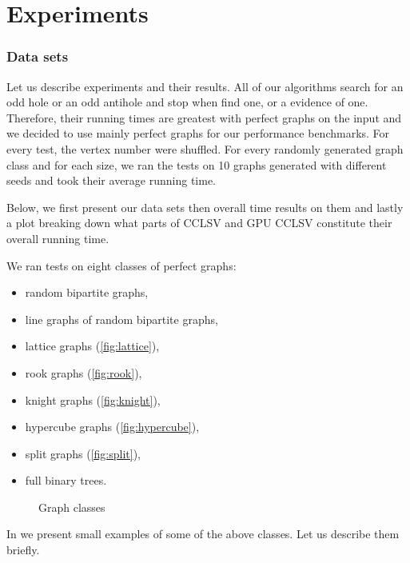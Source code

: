 \section{Experiments}
\label{sec:experiments}

\subsubsection{Data sets}

Let us describe experiments and their results. All of our algorithms search for an odd hole or an odd antihole and stop when find one, or a evidence of one. Therefore, their running times are greatest with perfect graphs on the input and we decided to use mainly perfect graphs for our performance benchmarks. For every test, the vertex number were shuffled. For every randomly generated graph class and for each size, we ran the tests on 10 graphs generated with different seeds and took their average running time.

Below, we first present our data sets then overall time results on them and lastly a plot breaking down what parts of CCLSV and GPU CCLSV constitute their overall running time.

We ran tests on eight classes of perfect graphs:
\begin{itemize}
  \item random bipartite graphs,
  \item line graphs of random bipartite graphs,
  \item lattice graphs (\cref{fig:lattice}),
  \item rook graphs (\cref{fig:rook}),
  \item knight graphs (\cref{fig:knight}),
  \item hypercube graphs (\cref{fig:hypercube}),
  \item split graphs (\cref{fig:split}),
  \item full binary trees.
\end{itemize}


\begin{figure}
  
  \caption{Graph classes}
  \label{fig:graphClasses}
\end{figure}

In  we present small examples of some of the above classes. Let us describe them briefly.

